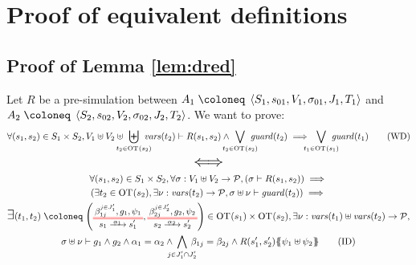 \documentclass{article}
\begin{document}
\section{Proof of equivalent definitions}

\subsection{Proof of Lemma \ref{lem:dred}}\label{apx:lemdred}
Let \(R\) be a pre-simulation between \(A_1 \defobject \OA{S_1}{s_{01}}{V_1}{\sigma_{01}}{J_1}{T_1}\) and \(A_2 \defobject \OA{S_2}{s_{02}}{V_2}{\sigma_{02}}{J_2}{T_2}\).
We want to prove:
\[ \forall \mpar{s_1, s_2} \in S_1 \times S_2, V_1 \uplus V_2 \uplus \biguplus_\subbox{t_2 \in \fOT{s_2}} \fvars{t_2} \vdash R\mpar{s_1, s_2} \wedge \bigvee_\subbox{t_2 \in \fOT{s_2}} \fguard{t_2} \implies \bigvee_\subbox{t_1 \in \fOT{s_1}} \fguard{t_1} \tag{WD}\label{eq:drWD} \]
\[ \text{\Large\(\displaystyle \iff\)} \]
\begin{multline}
	\forall \mpar{s_1, s_2} \in S_1 \times S_2, \forall \sigma: V_1 \uplus V_2 \to \values, \mpar{\sigma \vdash R\mpar{s_1, s_2}} \implies \\
	\mpar{\exists t_2 \in \fOT{s_2}, \exists \nu: \fvars{t_2} \to \values, \sigma \uplus \nu \vdash \fguard{t_2}} \implies \\
	\bigsymb{\exists} \mpar{t_1, t_2} \defobject \mpar{\OTx{1}{}{1}{1}, \OTx{2}{}{2}{2}} \in \fOT{s_1} \times \fOT{s_2}, \exists \nu: \fvars{t_1} \uplus \fvars{t_2} \to \values, \\
	\sigma \uplus \nu \vdash g_1 \wedge g_2 \wedge \alpha_1 = \alpha_2 \wedge \bigwedge_\subbox{j \in J'_1 \cap J'_2} \beta_{1j} = \beta_{2j} \wedge R\mpar{s'_1, s'_2}\psubst{\psi_1 \uplus \psi_2}\tag{ID}\label{eq:drID}
\end{multline}
\end{document}

